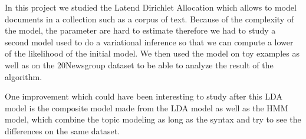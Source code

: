 \documentclass[12pt]{article}
\begin{document}
In this project we studied the Latend Dirichlet Allocation which allows to model documents in a collection such as a corpus of text. Because of the complexity of the model, the parameter are hard to estimate therefore we had to study a second model used to do a variational inference so that we can compute a lower of the likelihood of the initial model. We then used the model on toy examples as well as on the 20Newsgroup dataset to be able to analyze the result of the algorithm.

One improvement which could have been interesting to study after this LDA model is the composite model made from the LDA model as well as the HMM model, which combine the topic modeling as long as the syntax and try to see the differences on the same dataset. 
\end{document}
